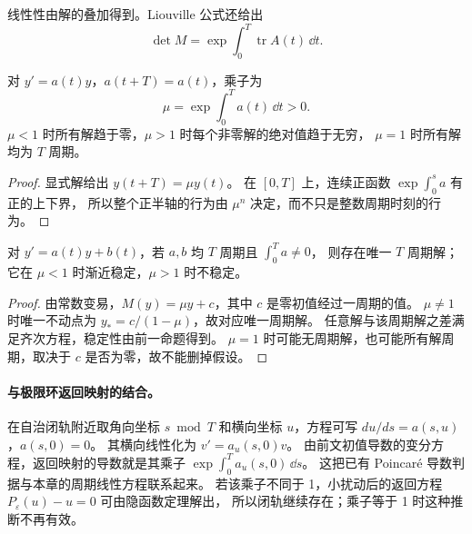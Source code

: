 线性性由解的叠加得到。Liouville 公式还给出
\[
 \det M=\exp\int_0^T\operatorname{tr}A(t)\,\dd t.
\]
\begin{proposition}[一维乘子]
对 $y'=a(t)y$，$a(t+T)=a(t)$，乘子为
\[
 \mu=\exp\displaystyle\int_0^Ta(t)\,\dd t>0.
\]
$\mu<1$ 时所有解趋于零，$\mu>1$ 时每个非零解的绝对值趋于无穷，
$\mu=1$ 时所有解均为 $T$ 周期。
\end{proposition}
\begin{proof}
显式解给出 $y(t+T)=\mu y(t)$。
在 $[0,T]$ 上，连续正函数 $\exp\displaystyle\int_0^sa$ 有正的上下界，
所以整个正半轴的行为由 $\mu^n$ 决定，而不只是整数周期时刻的行为。
\end{proof}
\begin{theorem}[周期非齐次方程]
对 $y'=a(t)y+b(t)$，若 $a,b$ 均 $T$ 周期且 $\displaystyle\int_0^Ta\ne0$，
则存在唯一 $T$ 周期解；它在 $\mu<1$ 时渐近稳定，$\mu>1$ 时不稳定。
\end{theorem}
\begin{proof}
由常数变易，$M(y)=\mu y+c$，其中 $c$ 是零初值经过一周期的值。
$\mu\ne1$ 时唯一不动点为 $y_*=c/(1-\mu)$，故对应唯一周期解。
任意解与该周期解之差满足齐次方程，稳定性由前一命题得到。
$\mu=1$ 时可能无周期解，也可能所有解周期，取决于 $c$ 是否为零，故不能删掉假设。
\end{proof}

\paragraph{与极限环返回映射的结合。}
在自治闭轨附近取角向坐标 $s\bmod T$ 和横向坐标 $u$，方程可写
$du/ds=a(s,u)$，$a(s,0)=0$。
其横向线性化为 $v'=a_u(s,0)v$。
由前文初值导数的变分方程，返回映射的导数就是其乘子
$\exp\displaystyle\int_0^Ta_u(s,0)\,\dd s$。
这把已有 Poincaré 导数判据与本章的周期线性方程联系起来。
若该乘子不同于 1，小扰动后的返回方程 $P_\varepsilon(u)-u=0$ 可由隐函数定理解出，
所以闭轨继续存在；乘子等于 1 时这种推断不再有效。

